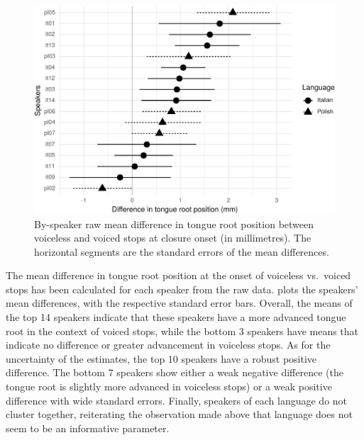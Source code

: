 \documentclass[preprint]{JASAnew}
\begin{document}
\begin{figure}
\includegraphics[width=\linewidth]{./Figure9} \caption{By-speaker raw mean difference in tongue root position between voiceless and voiced stops at closure onset (in millimetres). The horizontal segments are the standard errors of the mean differences.}\label{f:Figure9}
\end{figure}

The mean difference in tongue root position at the onset of voiceless
vs.~voiced stops has been calculated for each speaker from the raw data.
 plots the speakers' mean differences, with the
respective standard error bars. Overall, the means of the top 14
speakers indicate that these speakers have a more advanced tongue root
in the context of voiced stops, while the bottom 3 speakers have means
that indicate no difference or greater advancement in voiceless stops.
As for the uncertainty of the estimates, the top 10 speakers have a
robust positive difference. The bottom 7 speakers show either a weak
negative difference (the tongue root is slightly more advanced in
voiceless stops) or a weak positive difference with wide standard
errors. Finally, speakers of each language do not cluster together,
reiterating the observation made above that language does not seem to be
an informative parameter.
\end{document}
